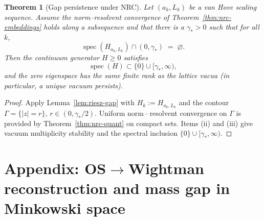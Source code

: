 \documentclass[11pt]{amsart}
\theoremstyle{plain}
\newtheorem{theorem}{Theorem}[section]
\theoremstyle{definition}
\theoremstyle{remark}
\begin{document}
\begin{theorem}[Gap persistence under NRC]\label{thm:gap-persist-cont}
Let $(a_k,L_k)$ be a van Hove scaling sequence. Assume the norm--resolvent convergence of Theorem~\ref{thm:nrc-embeddings} holds along a subsequence and that there is a $\gamma_*>0$ such that for all $k$,
\[
  \operatorname{spec}(H_{a_k,L_k})\cap(0,\gamma_*)\;=\;\varnothing.
\]
Then the continuum generator $H\ge 0$ satisfies
\[
  \operatorname{spec}(H)\subset \{0\}\cup[\gamma_*,\infty),
\]
and the zero eigenspace has the same finite rank as the lattice vacua (in particular, a unique vacuum persists).
\end{theorem}
\begin{proof}
Apply Lemma~\ref{lem:riesz-gap} with $H_k:=H_{a_k,L_k}$ and the contour $\Gamma=\{ |z|=r\}$, $r\in(0,\gamma_*/2)$. Uniform norm\,–\,resolvent convergence on $\Gamma$ is provided by Theorem~\ref{thm:nrc-quant} on compact sets. Items (ii) and (iii) give vacuum multiplicity stability and the spectral inclusion $\{0\}\cup[\gamma_*,\infty)$.
\end{proof}

\medskip
\section{Appendix: OS$\to$Wightman reconstruction and mass gap in Minkowski space}
\end{document}
